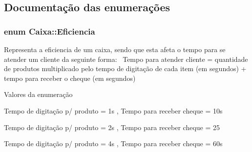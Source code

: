 \subsection{Documentação das enumerações}
\hypertarget{class_caixa_a0e98d0cd8dc2ff4f73d637d73f7bbe85}{
\subsubsection[{Eficiencia}]{\setlength{\rightskip}{0pt plus 5cm}enum {\bf Caixa\+::\+Eficiencia}}}\label{class_caixa_a0e98d0cd8dc2ff4f73d637d73f7bbe85}
Representa a eficiencia de um caixa, sendo que esta afeta o tempo para se atender um cliente da seguinte forma\+:~\newline
Tempo para atender cliente = quantidade de produtos multiplicado pelo tempo de digitação de cada item (em segundos) + tempo para receber o cheque (em segundos) \begin{Desc}
\item[Valores da enumeração]\par
\begin{description}
\item[{\em 
\hypertarget{class_caixa_a0e98d0cd8dc2ff4f73d637d73f7bbe85ac540cf6ebf89599c2551d4b9b03c48d7}{eficiente}\label{class_caixa_a0e98d0cd8dc2ff4f73d637d73f7bbe85ac540cf6ebf89599c2551d4b9b03c48d7}
}]Tempo de digitação p/ produto = 1s , Tempo para receber cheque = 10s \item[{\em 
\hypertarget{class_caixa_a0e98d0cd8dc2ff4f73d637d73f7bbe85a44121dbf9c403365d0a090127e43a499}{medio}\label{class_caixa_a0e98d0cd8dc2ff4f73d637d73f7bbe85a44121dbf9c403365d0a090127e43a499}
}]Tempo de digitação p/ produto = 2s , Tempo para receber cheque = 25 \item[{\em 
\hypertarget{class_caixa_a0e98d0cd8dc2ff4f73d637d73f7bbe85ad22f3ab5e25a4b9e6c8f534a88a04c7a}{ruim}\label{class_caixa_a0e98d0cd8dc2ff4f73d637d73f7bbe85ad22f3ab5e25a4b9e6c8f534a88a04c7a}
}]Tempo de digitação p/ produto = 4s , Tempo para receber cheque = 60s \end{description}
\end{Desc}



